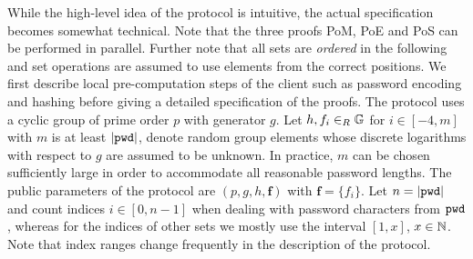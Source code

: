 While the high-level idea of the protocol is intuitive, the actual specification becomes somewhat technical.
Note that the three proofs \ac{PoM}, \ac{PoE} and \ac{PoS} can be performed in parallel.
Further note that all sets are \emph{ordered} in the following and set operations are assumed to use elements from the correct positions.
We first describe local pre-computation steps of the client such as password encoding and hashing before giving a detailed specification of the proofs.
The protocol uses a cyclic group \GG of prime order $p$ with generator $g$.
Let $h,f_i\in_R \mathbb{G}$ for $i\in[-4,m]$ with $m$ is at least $|\mathtt{pwd}|$, denote random group elements whose discrete logarithms with respect to $g$ are assumed to be unknown. 
In practice, $m$ can be chosen sufficiently large in order to accommodate all reasonable password lengths. The public parameters of the protocol are $(p,g,h,\bm f)$ with $\bm f = \{f_i\}$.
Let $n = |\mathtt{pwd}|$ and count indices $i\in[0,n-1]$ when dealing with password characters from $\mathtt{pwd}$, whereas for the indices of other sets we mostly use the interval $[1,x]$, $x\in\mathbb{N}$. Note that index ranges change frequently in the description of the protocol.

